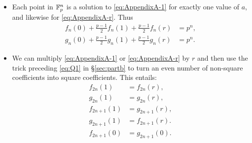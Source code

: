 \begin{itemize}
	\item Each point in $\mathbb{F}_p^n$ is a solution to \eqref{eq:AppendixA-1} for exactly one value of $a$, and likewise for \eqref{eq:AppendixA-r}. Thus
	\begin{align*}
		f_n(0) + \frac{p-1}{2}f_n(1) + \frac{p-1}{2}f_n(r) &= p^n,\\
		g_n(0) + \frac{p-1}{2}g_n(1) + \frac{p-1}{2}g_n(r) &= p^n.
	\end{align*}
	\item We can multiply \eqref{eq:AppendixA-1} or \eqref{eq:AppendixA-r} by $r$ and then use the trick preceding \eqref{eq:Q1} in \S\ref{sec:partb} to turn an even number of non-square coefficients into square coefficients. This entails:
	\begin{align*}
		f_{2n}(1) &= f_{2n}(r),\\
		g_{2n}(1) &= g_{2n}(r),\\
		f_{2n+1}(1) &= g_{2n+1}(r),\\
		g_{2n+1}(1) &= f_{2n+1}(r).\\
		f_{2n+1}(0) &= g_{2n+1}(0).
	\end{align*}
\end{itemize}